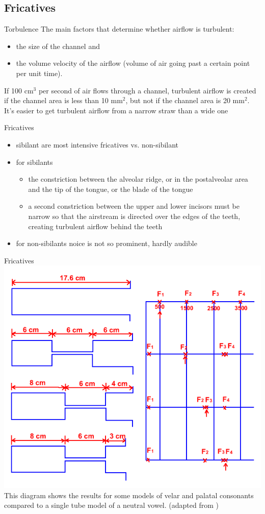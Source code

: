 \subsection{Fricatives}
\begin{frame}{Torbulence}
The main factors that determine whether airflow is turbulent: 
\begin{itemize}
\item the size of the channel and 
\item the volume velocity of the airflow (volume of air going past a certain point per unit time).
\end{itemize}
If 100 cm$^3$ per second of air flows through a channel, turbulent airflow is created if the channel area is less than 10 mm$^2$, but not if the channel area is 20 mm$^2$.
It’s easier to get turbulent airflow from a narrow straw than a wide one
\end{frame}
\begin{frame}{Fricatives}
\begin{itemize}
\item sibilant are most intensive fricatives vs. non-sibilant
\item for sibilants 
\begin{itemize}
\item the constriction between the alveolar ridge, or in the postalveolar area and the tip of the tongue, or the blade of the tongue
\item a second constriction between the upper and lower incisors must be narrow so that the airstream is directed over the edges of the teeth, creating turbulent airflow behind the teeth
\end{itemize}
\item for non-sibilants noice is not so prominent, hardly audible
\end{itemize}
\end{frame}
\begin{frame}{Fricatives}
\includegraphics[width=0.7\linewidth]{04-tube.png}\\
This diagram shows the results for some models of velar and palatal consonants compared to a single tube model of a neutral vowel. (adapted from \cite[73]{fant60})
\end{frame}

